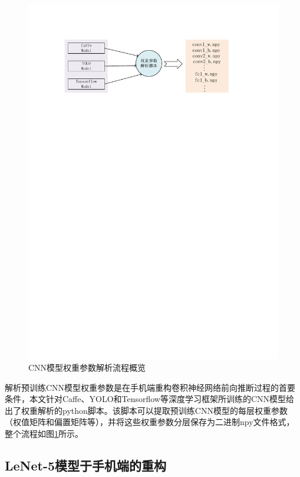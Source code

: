 \begin{figure}[htbp]
    \begin{center}
    \includegraphics{figures/weight.pdf}
    \end{center}
    \caption{CNN模型权重参数解析流程概览}\label{figure:figure14}
\end{figure}

解析预训练CNN模型权重参数是在手机端重构卷积神经网络前向推断过程的首要条件，本文针对Caffe、YOLO和Tensorflow等深度学习框架所训练的CNN模型给出了权重解析的python脚本。该脚本可以提取预训练CNN模型的每层权重参数（权值矩阵和偏置矩阵等），并将这些权重参数分层保存为二进制npy文件格式，整个流程如图\ref{figure:figure14}所示。

\subsection{LeNet-5模型于手机端的重构}

